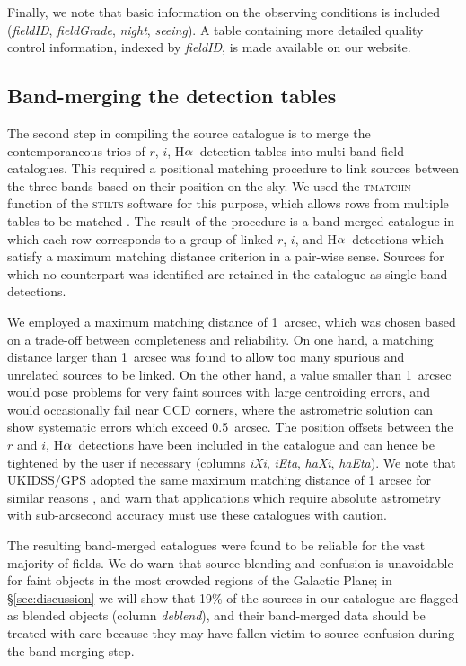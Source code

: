 \documentclass[useAMS,usenatbib]{mn2e}
\def\ha{\mbox{H$\rm \alpha$}}
\begin{document}
Finally, we note that basic information on the observing conditions
is included (\emph{fieldID}, \emph{fieldGrade}, \emph{night}, \emph{seeing}).
A table containing more detailed quality control information,
indexed by \emph{fieldID}, is made available on our website.

\subsection{Band-merging the detection tables}

The second step in compiling the source catalogue
is to merge the contemporaneous trios
of $r$, $i$, \ha\ detection tables
into multi-band field catalogues.
This required a positional matching procedure 
to link sources between the three bands
based on their position on the sky.
We used the \textsc{tmatchn} function 
of the \textsc{stilts} software for this purpose,
which allows rows from multiple tables to be matched \citep{Taylor2006}.
The result of the procedure is a band-merged catalogue
in which each row corresponds to a group of linked $r$, $i$, and \ha\ detections
which satisfy a maximum matching distance criterion in a pair-wise sense.
Sources for which no counterpart was identified
are retained in the catalogue as single-band detections.

We employed a maximum matching distance of 1~arcsec,
which was chosen based on a trade-off between 
completeness and reliability.
On one hand, a matching distance larger than 1~arcsec 
was found to allow too many spurious and unrelated sources 
to be linked. 
On the other hand, a value smaller than 1~arcsec 
would pose problems for very faint sources 
with large centroiding errors, 
and would occasionally fail near CCD corners,
where the astrometric solution can 
show systematic errors which exceed 0.5~arcsec.
The position offsets between the $r$ and $i$, \ha\ detections
have been included in the catalogue 
and can hence be tightened by the user if necessary
(columns \emph{iXi}, \emph{iEta}, \emph{haXi}, \emph{haEta}).
We note that UKIDSS/GPS adopted 
the same maximum matching distance of 1 arcsec
for similar reasons \citep{Hambly2008},
and warn that applications which require absolute
astrometry with sub-arcsecond accuracy must
use these catalogues with caution.

The resulting band-merged catalogues were found
to be reliable for the vast majority of fields.
We do warn that source blending and confusion is unavoidable
for faint objects in the most crowded regions of the Galactic Plane;
in \S\ref{sec:discussion} we will show
that 19\% of the sources in our catalogue
are flagged as blended objects (column \emph{deblend}),
and their band-merged data should be treated with care
because they may have fallen victim to source confusion
during the band-merging step.
\end{document}
